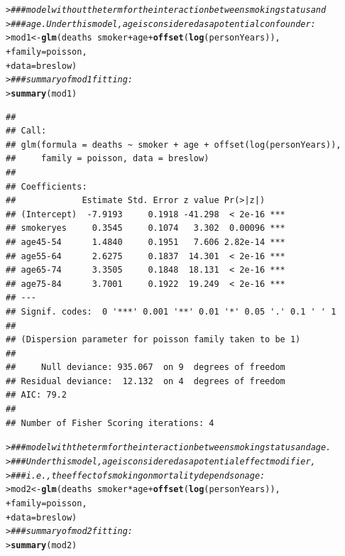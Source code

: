\documentclass[a4paper,10pt]{article}\usepackage[]{graphicx}\usepackage[]{xcolor}
\makeatletter
\newcommand{\hlcom}[1]{\textcolor[rgb]{0.678,0.584,0.686}{\textit{#1}}}%
\newcommand{\hlopt}[1]{\textcolor[rgb]{0,0,0}{#1}}%
\newcommand{\hldef}[1]{\textcolor[rgb]{0.345,0.345,0.345}{#1}}%
\newcommand{\hlkwb}[1]{\textcolor[rgb]{0.69,0.353,0.396}{#1}}%
\newcommand{\hlkwc}[1]{\textcolor[rgb]{0.333,0.667,0.333}{#1}}%
\newcommand{\hlkwd}[1]{\textcolor[rgb]{0.737,0.353,0.396}{\textbf{#1}}}%
\newenvironment{kframe}{%
 \def\at@end@of@kframe{}%
 \ifinner\ifhmode%
  \def\at@end@of@kframe{\end{minipage}}%
  \begin{minipage}{\columnwidth}%
 \fi\fi%
 \def\FrameCommand##1{\hskip\@totalleftmargin \hskip-\fboxsep
 \colorbox{shadecolor}{##1}\hskip-\fboxsep
     \hskip-\linewidth \hskip-\@totalleftmargin \hskip\columnwidth}%
 \MakeFramed {\advance\hsize-\width
   \@totalleftmargin\z@ \linewidth\hsize
   \@setminipage}}%
 {\par\unskip\endMakeFramed%
 \at@end@of@kframe}
\newenvironment{knitrout}{}{} %
\makeatother
\begin{document}
\begin{enumerate}
\begin{knitrout}\footnotesize
{}\color{fgcolor}\begin{kframe}
\begin{alltt}
\hldef{> }\hlcom{### model without the term for the interaction between smoking status and}
\hldef{> }\hlcom{### age. Under this model, age is considered as a potential confounder:}
\hldef{> }\hldef{mod1} \hlkwb{<-} \hlkwd{glm}\hldef{(deaths} \hlopt{~} \hldef{smoker} \hlopt{+} \hldef{age} \hlopt{+} \hlkwd{offset}\hldef{(}\hlkwd{log}\hldef{(personYears)),}
\hldef{+ }            \hlkwc{family} \hldef{= poisson,}
\hldef{+ }            \hlkwc{data} \hldef{= breslow)}
\hldef{> }\hlcom{### summary of mod1 fitting:}
\hldef{> }\hlkwd{summary}\hldef{(mod1)}
\end{alltt}
\begin{verbatim}
## 
## Call:
## glm(formula = deaths ~ smoker + age + offset(log(personYears)), 
##     family = poisson, data = breslow)
## 
## Coefficients:
##             Estimate Std. Error z value Pr(>|z|)    
## (Intercept)  -7.9193     0.1918 -41.298  < 2e-16 ***
## smokeryes     0.3545     0.1074   3.302  0.00096 ***
## age45-54      1.4840     0.1951   7.606 2.82e-14 ***
## age55-64      2.6275     0.1837  14.301  < 2e-16 ***
## age65-74      3.3505     0.1848  18.131  < 2e-16 ***
## age75-84      3.7001     0.1922  19.249  < 2e-16 ***
## ---
## Signif. codes:  0 '***' 0.001 '**' 0.01 '*' 0.05 '.' 0.1 ' ' 1
## 
## (Dispersion parameter for poisson family taken to be 1)
## 
##     Null deviance: 935.067  on 9  degrees of freedom
## Residual deviance:  12.132  on 4  degrees of freedom
## AIC: 79.2
## 
## Number of Fisher Scoring iterations: 4
\end{verbatim}
\begin{alltt}
\hldef{> }\hlcom{### model with the term for the interaction between smoking status and age.}
\hldef{> }\hlcom{### Under this model, age is considered as a potential effect modifier,}
\hldef{> }\hlcom{### i.e., the effect of smoking on mortality depends on age:}
\hldef{> }\hldef{mod2} \hlkwb{<-} \hlkwd{glm}\hldef{(deaths} \hlopt{~} \hldef{smoker} \hlopt{*} \hldef{age} \hlopt{+} \hlkwd{offset}\hldef{(}\hlkwd{log}\hldef{(personYears)),}
\hldef{+ }            \hlkwc{family} \hldef{= poisson,}
\hldef{+ }            \hlkwc{data} \hldef{= breslow)}
\hldef{> }\hlcom{### summary of mod2 fitting:}
\hldef{> }\hlkwd{summary}\hldef{(mod2)}
\end{alltt}
\begin{verbatim}

\end{verbatim}
\end{kframe}
\end{knitrout}
\end{enumerate}
\end{document}

